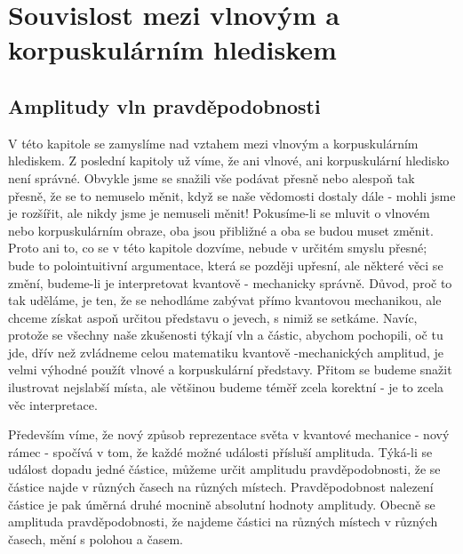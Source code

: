 \setchaptertoc
\chapter{Souvislost mezi vlnovým a korpuskulárním hlediskem}\label{fyz:IchapXXXVIII}
  \section{Amplitudy vln pravděpodobnosti}\label{fyz:IchapXXXVIIIsecI}
    V této kapitole se zamyslíme nad vztahem mezi vlnovým a korpuskulárním hlediskem. Z poslední
    kapitoly už víme, že ani vlnové, ani korpuskulární hledisko není správné. Obvykle jsme se
    snažili vše podávat přesně nebo alespoň tak přesně, že se to nemuselo měnit, když se naše
    vědomosti dostaly dále - mohli jsme je rozšířit, ale nikdy jsme je nemuseli měnit! Pokusíme-li
    se mluvit o vlnovém nebo korpuskulárním obraze, oba jsou přibližné a oba se budou muset změnit.
    Proto ani to, co se v této kapitole dozvíme, nebude v určitém smyslu přesné; bude to
    polointuitivní argumentace, která se později upřesní, ale některé věci se změní, budeme-li je
    interpretovat kvantově - mechanicky správně. Důvod, proč to tak uděláme, je ten, že se nehodláme
    zabývat přímo kvantovou mechanikou, ale chceme získat aspoň určitou představu o jevech, s nimiž
    se setkáme. Navíc, protože se všechny naše zkušenosti týkají vln a částic, abychom pochopili, oč
    tu jde, dřív než zvládneme celou matematiku kvantově -mechanických amplitud, je velmi výhodné
    použít vlnové a korpuskulární představy. Přitom se budeme snažit ilustrovat nejslabší místa, ale
    většinou budeme téměř zcela korektní - je to zcela věc interpretace.

    Především víme, že nový způsob reprezentace světa v kvantové mechanice - nový rámec - spočívá v
    tom, že každé možné události přísluší amplituda. Týká-li se událost dopadu jedné částice, můžeme
    určit amplitudu pravděpodobnosti, že se částice najde v různých časech na různých místech.
    Pravděpodobnost nalezení částice je pak úměrná druhé mocnině absolutní hodnoty amplitudy. Obecně
    se amplituda pravděpodobnosti, že najdeme částici na různých místech v různých časech, mění s
    polohou a časem. 

